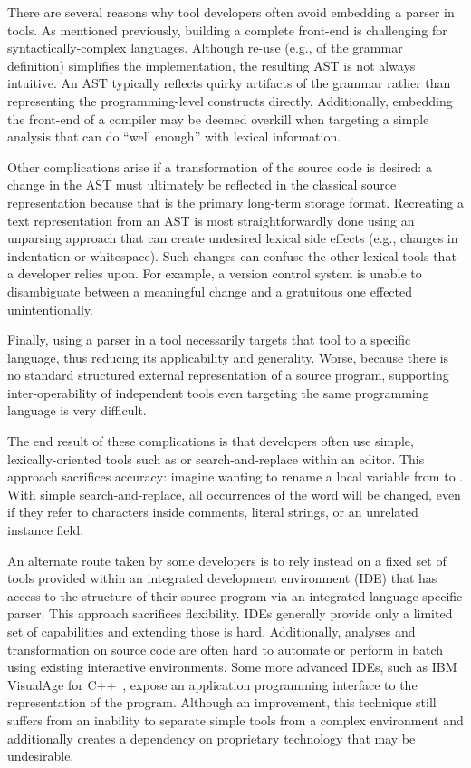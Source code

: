 \documentclass{article}
\begin{document}
\begin{multicols}{2}
There are several reasons why tool developers often avoid embedding a
parser in tools.  As mentioned previously, building a complete front-end
is challenging for syntactically-complex languages.  Although re-use
(e.g., of the grammar definition) simplifies the
implementation, the resulting AST is not always intuitive.
An AST typically reflects quirky artifacts of the grammar rather than
representing the programming-level constructs directly.  Additionally,
embedding the front-end of a compiler may be deemed overkill when
targeting a simple analysis that can do ``well enough'' with lexical
information.

Other complications arise if a transformation of the source code is
desired: a change in the AST must ultimately be reflected in the
classical source representation because that is the primary long-term
storage format.  Recreating a text representation from an AST is most
straightforwardly done using an unparsing approach that can create
undesired lexical side effects (e.g., changes in indentation or
whitespace).  Such changes can confuse the other lexical tools that a developer relies
upon.  For example, a version control system is unable to disambiguate
between a meaningful change and a gratuitous one effected
unintentionally.  

Finally, using a parser in a tool necessarily targets
that tool to a specific language, thus reducing its applicability and
generality.  Worse, because there is no standard structured external
representation of a source program, supporting inter-operability of
independent tools even targeting the same programming language is very
difficult.

The end result of these complications is that developers often use
simple, lexically-oriented tools such as  or
search-and-replace within an editor.  This approach sacrifices accuracy:
imagine wanting to rename a local variable from  to
.  With simple search-and-replace, all occurrences of
the word will be changed, even if they refer to characters inside
comments, literal strings, or an unrelated instance field.

An alternate route taken by some developers is to rely instead on
a fixed set of tools provided within an integrated development
environment (IDE) that has access to the structure of their source
program via an integrated language-specific parser.  This approach
sacrifices flexibility.  IDEs generally provide only a limited set of
capabilities and extending those is hard.  Additionally, analyses and
transformation on source code are often hard to automate or perform in
batch using existing interactive environments.  Some more advanced IDEs,
such as IBM VisualAge for C++~\cite{Soroker97}, expose an application
programming interface to the representation of the program.  Although an
improvement, this technique still suffers from an inability to separate
simple tools from a complex environment and additionally creates a
dependency on proprietary technology that may be undesirable.


\end{multicols}
\end{document}
